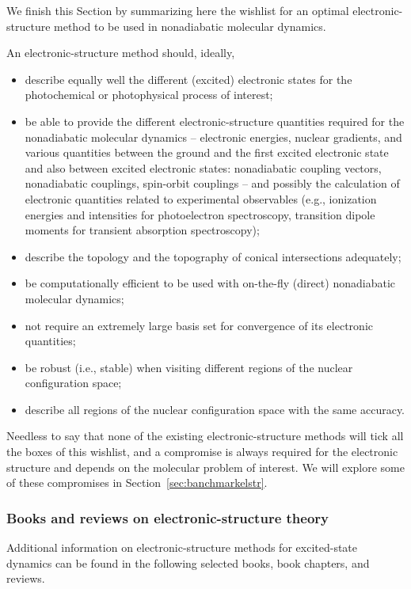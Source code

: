 \documentclass[9pt,bestpractices,pubversion]{livecoms}
\begin{document}
We finish this Section by summarizing here the wishlist for an optimal electronic-structure method to be used in nonadiabatic molecular dynamics. 

An electronic-structure method should, ideally,
\begin{itemize}
\item describe equally well the different (excited) electronic states for the photochemical or photophysical process of interest;
\item be able to provide the different electronic-structure quantities required for the nonadiabatic molecular dynamics -- electronic energies, nuclear gradients, and various quantities between the ground and the first excited electronic state and also between excited electronic states: nonadiabatic coupling vectors, nonadiabatic couplings, spin-orbit couplings -- and possibly the calculation of electronic quantities related to experimental observables (e.g., ionization energies and intensities for photoelectron spectroscopy, transition dipole moments for transient absorption spectroscopy);
\item describe the topology and the topography of conical intersections adequately;
\item be computationally efficient to be used with on-the-fly (direct) nonadiabatic molecular dynamics;
\item not require an extremely large basis set for convergence of its electronic quantities;
\item be robust (i.e., stable) when visiting different regions of the nuclear configuration space;
\item describe all regions of the nuclear configuration space with the same accuracy.
\end{itemize}

Needless to say that none of the existing electronic-structure methods will tick all the boxes of this wishlist, and a compromise is always required for the electronic structure and depends on the molecular problem of interest. We will explore some of these compromises in Section~\ref{sec:banchmarkelstr}.

\subsubsection{Books and reviews on electronic-structure theory}
\label{sec:elecstructbook}

Additional information on electronic-structure methods for excited-state dynamics can be found in the following selected books\cite{gonzalez_quantum_2021,tddftcarsten,GONZALEZ20241,conicalintersection2004}, book chapters,\cite{barbatti2014surface} and reviews.\cite{park2020multireference,lischka2018multireference,dreuw2015algebraic,crespo2018recent,curchod2013local,matsika_electronic_2021}
\end{document}
